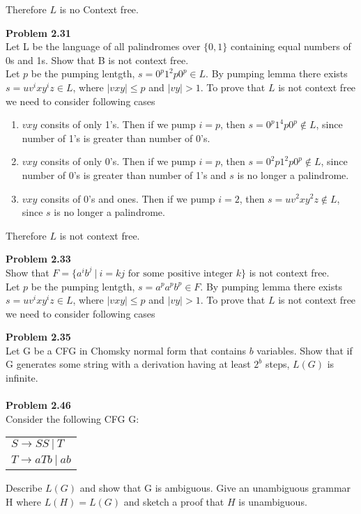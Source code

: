 \documentclass{article}
\newcommand{\problem}[1]{\large{\textbf{Problem #1} \\}}
\begin{document}
Therefore $L$ is no Context free.

\vspace{0.4cm}
\problem{2.31}
Let L be the language of all palindromes over $\{0,1\}$ containing equal numbers of 0s and 1s. Show that B is not context free. \\

Let $p$ be the pumping lentgth, $s = 0^p 1^2p 0^p \in L$. By pumping lemma 
there exists $s = uv^ixy^iz \in L$, where $|vxy| \leq p$ and $|vy| > 1$. To prove
that $L$ is not context free we need to consider following cases
\begin{enumerate}[Case 1., leftmargin = 1.5cm]
\itemsep0em
\item $vxy$ consits of only 1's. Then if we pump $i = p$, then $s = 0^p 1^4p 0^p \notin L$, since
number of 1's is greater than number of 0's.
\item $vxy$ consits of only 0's. Then if we pump $i = p$, then $s = 0^2p 1^2p 0^p \notin L$, since
number of 0's is greater than number of 1's and $s$ is no longer a palindrome.
\item $vxy$ consits of 0's and ones. Then if we pump $i = 2$, then $s = u v^2 x y^2 z \notin L$, since
$s$ is no longer a palindrome.
\end{enumerate}

Therefore $L$ is not context free.

\vspace{0.4cm}
\problem{2.33}
Show that $F = \{a^i b^j\: |\: i = kj\text{ for some positive integer } k\}$ is not context free. \\

Let $p$ be the pumping lentgth, $s = a^p a^p b^p \in F$. By pumping lemma 
there exists $s = uv^ixy^iz \in L$, where $|vxy| \leq p$ and $|vy| > 1$. To prove
that $L$ is not context free we need to consider following cases

\vspace{0.4cm}
\problem{2.35}
Let G be a CFG in Chomsky normal form that contains $b$ variables. Show that if G generates some string with a derivation having 
at least $2^b$ steps, $L(G)$ is infinite. \\ \\
\problem{2.46}
Consider the following CFG G:
\begin{table}[h!]
\centering
\begin{tabular}{l}
$S \rightarrow SS \:| \:T$ \\
$T \rightarrow aTb \:| \:ab$
\end{tabular}
\end{table}
Describe $L(G)$ and show that G is ambiguous. Give an unambiguous grammar H where $L(H) = L(G)$ and
sketch a proof that $H$ is unambiguous. \\
\end{document}
